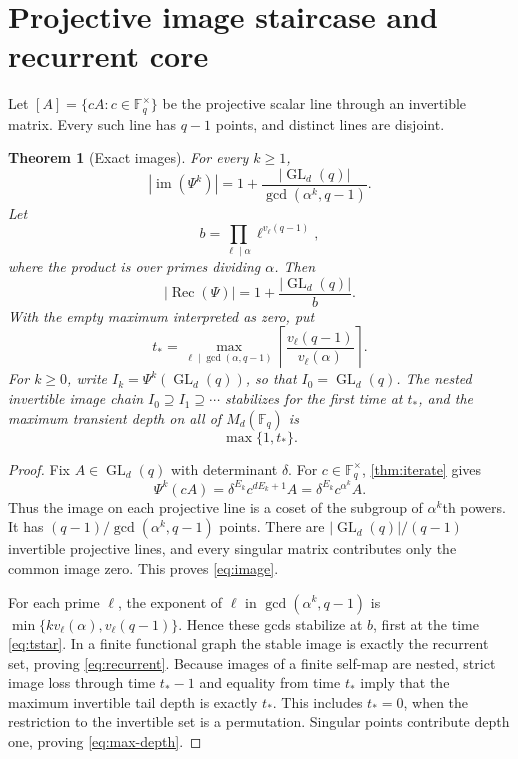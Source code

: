 \documentclass[11pt,a4paper]{amsart}
\newtheorem{theorem}{Theorem}[section]
\theoremstyle{definition}
\theoremstyle{remark}
\newcommand{\F}{\mathbb F}
\newcommand{\GL}{\operatorname{GL}}
\newcommand{\im}{\operatorname{im}}
\newcommand{\Rec}{\operatorname{Rec}}
\begin{document}
\section{Projective image staircase and recurrent core}

Let $[A]=\{cA:c\in\F_q^\times\}$ be the projective scalar line through an
invertible matrix.  Every such line has $q-1$ points, and distinct lines are
disjoint.

\begin{theorem}[Exact images]\label{thm:image}
For every $k\ge1$,
\begin{equation}\label{eq:image}
 \boxed{\displaystyle
 |\im(\Psi^k)|
 =1+\frac{|\GL_d(q)|}{\gcd(\alpha^k,q-1)}.}
\end{equation}
Let
\begin{equation}\label{eq:b}
 b=\prod_{\ell\mid\alpha}\ell^{v_\ell(q-1)},
\end{equation}
where the product is over primes dividing $\alpha$.  Then
\begin{equation}\label{eq:recurrent}
 |\Rec(\Psi)|=1+\frac{|\GL_d(q)|}{b}.
\end{equation}
With the empty maximum interpreted as zero, put
\begin{equation}\label{eq:tstar}
 t_*=\max_{\ell\mid\gcd(\alpha,q-1)}
 \left\lceil\frac{v_\ell(q-1)}{v_\ell(\alpha)}\right\rceil.
\end{equation}
For $k\geq0$, write $I_k=\Psi^k(\GL_d(q))$, so that
$I_0=\GL_d(q)$.  The nested invertible image chain
$I_0\supseteq I_1\supseteq\cdots$ stabilizes for the first time at $t_*$,
and the maximum transient depth on all of $M_d(\F_q)$ is
\begin{equation}\label{eq:max-depth}
 \boxed{\max\{1,t_*\}.}
\end{equation}
\end{theorem}

\begin{proof}
Fix $A\in\GL_d(q)$ with determinant $\delta$.  For $c\in\F_q^\times$,
\cref{thm:iterate} gives
\begin{equation}\label{eq:line-action}
 \Psi^k(cA)=\delta^{E_k}c^{dE_k+1}A
 =\delta^{E_k}c^{\alpha^k}A.
\end{equation}
Thus the image on each projective line is a coset of the subgroup of
$\alpha^k$th powers.  It has
$(q-1)/\gcd(\alpha^k,q-1)$ points.  There are
$|\GL_d(q)|/(q-1)$ invertible projective lines, and every singular matrix
contributes only the common image zero.  This proves \eqref{eq:image}.

For each prime $\ell$, the exponent of $\ell$ in
$\gcd(\alpha^k,q-1)$ is
$\min\{k v_\ell(\alpha),v_\ell(q-1)\}$.  Hence these gcds stabilize at
$b$, first at the time \eqref{eq:tstar}.  In a finite functional graph the
stable image is exactly the recurrent set, proving \eqref{eq:recurrent}.
Because images of a finite self-map are nested, strict image loss through
time $t_*-1$ and equality from time $t_*$ imply that the maximum invertible
tail depth is exactly $t_*$.  This includes $t_*=0$, when the restriction to
the invertible set is a permutation.  Singular points contribute depth one,
proving \eqref{eq:max-depth}.
\end{proof}
\end{document}
